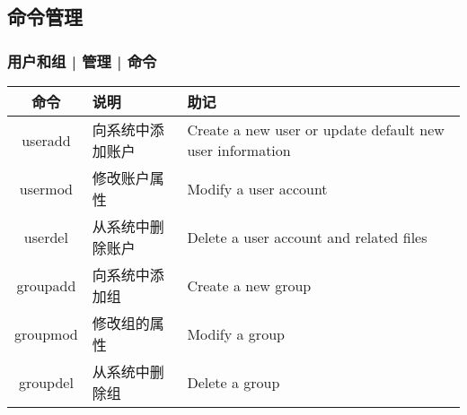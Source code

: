 \subsection{命令管理}
\begin{frame}
  \frametitle{用户和组 | 管理 | \alert{命令}}
  \begin{table}
    \centering
    \begin{tabularx}{\textwidth}{clX}
      \hline
      \rowcolor{blue!50}命令 & 说明 & 助记\\
      \hline
      \alert{useradd} & 向系统中添加账户 & Create a new user or update default new user information\\
      usermod & 修改账户属性 & Modify a user account\\
      userdel & 从系统中删除账户 & Delete a user account and related files\\
      \hline
      groupadd & 向系统中添加组 & Create a new group\\
      groupmod & 修改组的属性 & Modify a group\\
      groupdel & 从系统中删除组 & Delete a group\\
      \hline
    \end{tabularx}
  \end{table}
\end{frame}

